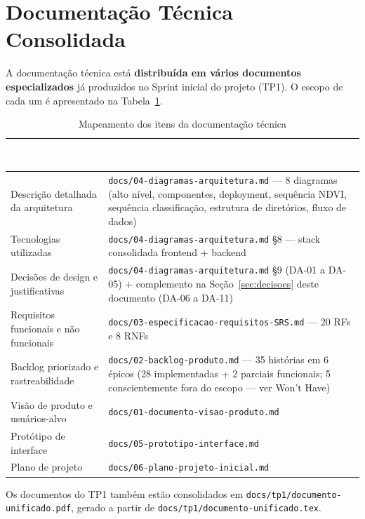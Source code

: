 \documentclass[11pt, a4paper]{article}
\begin{document}
\section{Documentação Técnica Consolidada}
\label{sec:doctec}

A documentação técnica está \textbf{distribuída em vários documentos especializados} já produzidos no Sprint inicial do projeto (TP1). O escopo de cada um é apresentado na Tabela~\ref{tab:doctec}.

\begin{table}[H]
\centering
\small
{}
\begin{tabularx}{\textwidth}{@{}lX@{}}
\toprule
\rowcolor{tabheader}\textcolor{white}{\textbf{Item exigido pela P2}} & \textcolor{white}{\textbf{Documento(s)}}\\
\midrule
Descrição detalhada da arquitetura & \texttt{docs/04-diagramas-arquitetura.md} --- 8 diagramas (alto nível, componentes, deployment, sequência NDVI, sequência classificação, estrutura de diretórios, fluxo de dados)\\
Tecnologias utilizadas & \texttt{docs/04-diagramas-arquitetura.md} \S 8 --- stack consolidada frontend + backend\\
Decisões de design e justificativas & \texttt{docs/04-diagramas-arquitetura.md} \S 9 (DA-01 a DA-05) + complemento na Seção~\ref{sec:decisoes} deste documento (DA-06 a DA-11)\\
Requisitos funcionais e não funcionais & \texttt{docs/03-especificacao-requisitos-SRS.md} --- 20 RFs e 8 RNFs\\
Backlog priorizado e rastreabilidade & \texttt{docs/02-backlog-produto.md} --- 35 histórias em 6 épicos (28 implementadas + 2 parciais funcionais; 5 conscientemente fora do escopo --- ver Won't Have)\\
Visão de produto e usuários-alvo & \texttt{docs/01-documento-visao-produto.md}\\
Protótipo de interface & \texttt{docs/05-prototipo-interface.md}\\
Plano de projeto & \texttt{docs/06-plano-projeto-inicial.md}\\
\bottomrule
\end{tabularx}
\caption{Mapeamento dos itens da documentação técnica}
\label{tab:doctec}
\end{table}

\begin{infobox}
Os documentos do TP1 também estão consolidados em \texttt{docs/tp1/documento-unificado.pdf}, gerado a partir de \texttt{docs/tp1/documento-unificado.tex}.
\end{infobox}
\end{document}
